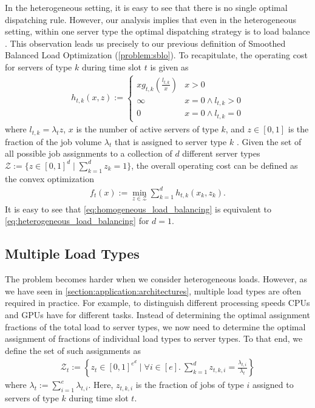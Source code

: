 In the heterogeneous setting, it is easy to see that there is no single optimal dispatching rule. However, our analysis implies that even in the heterogeneous setting, within one server type the optimal dispatching strategy is to load balance \cite{Albers2021_2}. This observation leads us precisely to our previous definition of Smoothed Balanced Load Optimization (\autoref{problem:sblo}). To recapitulate, the operating cost for servers of type $k$ during time slot $t$ is given as \begin{align}\label{eq:heterogeneous_load_balancing_unit}
    h_{t,k}(x,z) := \begin{cases}
        x g_{t,k}\left(\frac{l_{t,k}}{x}\right) & x > 0 \\
        \infty                                  & x = 0 \land l_{t,k} > 0 \\
        0                                       & x = 0 \land l_{t,k} = 0
    \end{cases}
\end{align} where $l_{t,k} = \lambda_t z$, $x$ is the number of active servers of type $k$, and $z \in [0,1]$ is the fraction of the job volume $\lambda_t$ that is assigned to server type $k$ \cite{Albers2021_2}. Given the set of all possible job assignments to a collection of $d$ different server types $\mathcal{Z} := \{z \in [0,1]^d \mid \sum_{k=1}^d z_k = 1\}$, the overall operating cost can be defined as the convex optimization \begin{align}\label{eq:heterogeneous_load_balancing}
    f_t(x) := \min_{z \in \mathcal{Z}} \sum_{k=1}^d h_{t,k}(x_k,z_k).
\end{align} It is easy to see that \autoref{eq:homogeneous_load_balancing} is equivalent to \autoref{eq:heterogeneous_load_balancing} for $d = 1$.

\subsection{Multiple Load Types}\label{section:application:dispatching:multiple_load_types}

The problem becomes harder when we consider heterogeneous loads. However, as we have seen in \autoref{section:application:architectures}, multiple load types are often required in practice. For example, to distinguish different processing speeds CPUs and GPUs have for different tasks. Instead of determining the optimal assignment fractions of the total load to server types, we now need to determine the optimal assignment of fractions of individual load types to server types. To that end, we define the set of such assignments as \begin{align*}
    \mathcal{Z}_t := \left\{z_t \in [0,1]^{e^d} \mid \forall i \in [e].\ \sum_{k=1}^d z_{t,k,i} = \frac{\lambda_{t,i}}{\lambda_t}\right\}
\end{align*} where $\lambda_t := \sum_{i=1}^e \lambda_{t,i}$. Here, $z_{t,k,i}$ is the fraction of jobs of type $i$ assigned to servers of type $k$ during time slot $t$.

